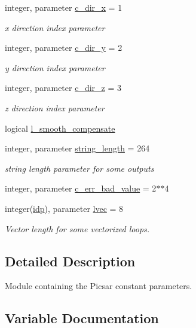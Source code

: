 \begin{DoxyCompactItemize}
integer, parameter \hyperlink{namespaceconstants_a8e38e74e9723ce351e7a20787e649e89}{c\+\_\+dir\+\_\+x} = 1
\begin{DoxyCompactList}\small\item\em x direction index parameter \end{DoxyCompactList}\item 
integer, parameter \hyperlink{namespaceconstants_a5d84bc6ed2e3bd7b6e64704dc587825b}{c\+\_\+dir\+\_\+y} = 2
\begin{DoxyCompactList}\small\item\em y direction index parameter \end{DoxyCompactList}\item 
integer, parameter \hyperlink{namespaceconstants_a9d2fa70332164d956c148a895e769983}{c\+\_\+dir\+\_\+z} = 3
\begin{DoxyCompactList}\small\item\em z direction index parameter \end{DoxyCompactList}\item 
logical \hyperlink{namespaceconstants_a91e41f33367410db88a66890aae444cc}{l\+\_\+smooth\+\_\+compensate}
\item 
integer, parameter \hyperlink{namespaceconstants_a6082bfa433cfb27d3f80d0f32b278570}{string\+\_\+length} = 264
\begin{DoxyCompactList}\small\item\em string length parameter for some outputs \end{DoxyCompactList}\item 
integer, parameter \hyperlink{namespaceconstants_a0c96dab545557ad23bf55d7576f5405f}{c\+\_\+err\+\_\+bad\+\_\+value} = 2$\ast$$\ast$4
\item 
integer(\hyperlink{namespaceconstants_ae345db51770e3628e6aaf76e6a45e160}{idp}), parameter \hyperlink{namespaceconstants_a68354913203e3e01c9b0b547e9d95aae}{lvec} = 8
\begin{DoxyCompactList}\small\item\em Vector length for some vectorized loops. \end{DoxyCompactList}\end{DoxyCompactItemize}


\subsection{Detailed Description}
Module containing the Picsar constant parameters. 

\subsection{Variable Documentation}
